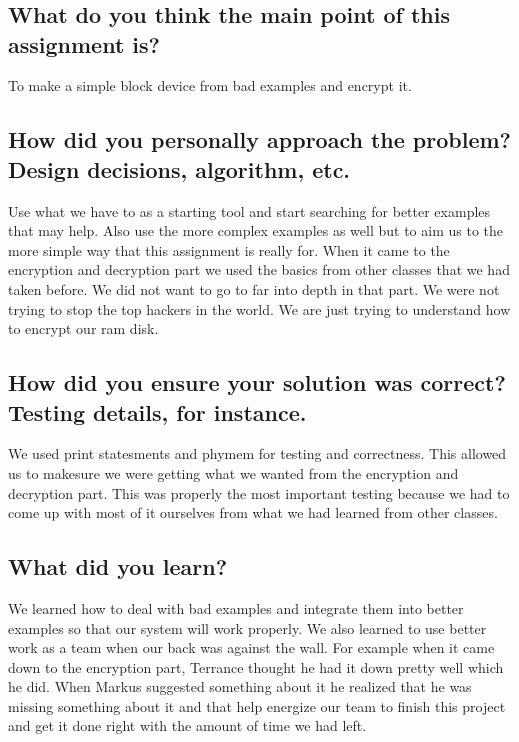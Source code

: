 \documentclass[draftclsnofoot,onecolumn,10pt,compsoc]{IEEEtran}
\begin{document}
\section{}
\subsection{What do you think the main point of this assignment is?}
To make a simple block device from bad examples and encrypt it.  
\subsection{How did you personally approach the problem? Design decisions, algorithm, etc.}
Use what we have to as a starting tool and start searching for better examples that may help. Also use the more complex examples as well but to aim us to the more simple way that this assignment is really for.  When it came to the encryption and decryption part we used the basics from other classes that we had taken before.  We did not want to go to far into depth in that part.  We were not trying to stop the top hackers in the world.  We are just trying to understand how to encrypt our ram disk.    
\subsection{How did you ensure your solution was correct? Testing details, for instance.}
We used print statesments and phymem for testing and correctness.  This allowed us to makesure we were getting what we wanted from the encryption and decryption part.  This was properly the most important testing because we had to come up with most of it ourselves from what we had learned from other classes. 
\subsection{What did you learn?}
We learned how to deal with bad examples and integrate them into better examples so that our system will work properly.  We also learned to use better work as a team when our back was against the wall.  For example when it came down to the encryption part, Terrance thought he had it down pretty well which he did.  When Markus suggested something about it he realized that he was missing something about it and that help energize our team to finish this project and get it done right with the amount of time we had left. 
\end{document}
